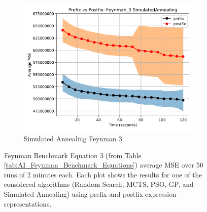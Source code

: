 \documentclass[12pt]{iopart}
\begin{document}
\begin{figure}
    \vspace{0.5cm}
    
    \begin{subfigure}[b]{0.4\textwidth}
        \includegraphics[width=\linewidth, keepaspectratio]{AIFeynman_Benchmarks/PrePostFeynman_3SimulatedAnnealing.pdf}
        \caption{Simulated Annealing Feynman 3}
        \label{subfig:feynman_3_SA}
    \end{subfigure}
    
    \caption{Feynman Benchmark Equation 3 (from Table \ref{tab:AI_Feynman_Benchmark_Equations}) average MSE over 50 runs of 2 minutes each. Each plot shows the results for one of the considered algorithms (Random Search, MCTS, PSO, GP, and Simulated Annealing) using prefix and postfix expression representations.}
    \label{fig:AIFeynman_3_Benchmarks}
\end{figure}
\end{document}

